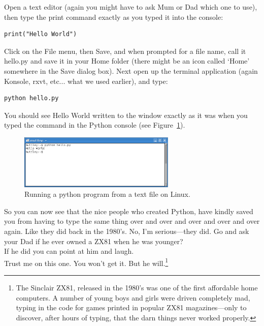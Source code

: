 \begin{LINUX}
Open a text editor (again you might have to ask Mum or Dad which one to use), then type the print command exactly as you typed it into the console:

\begin{listing}
\begin{verbatim}
print("Hello World")
\end{verbatim}
\end{listing}

Click on the File menu, then Save, and when prompted for a file name, call it hello.py and save it in your Home folder (there might be an icon called `Home' somewhere in the Save dialog box).  Next open up the terminal application (again Konsole, rxvt, etc... what we used earlier), and type:

\begin{listing}
\begin{verbatim}
python hello.py
\end{verbatim}
\end{listing}

You should see Hello World written to the window exactly as it was when you typed the command in the Python console (see Figure~\ref{fig9}).

\begin{figure}
\begin{center}
\includegraphics[width=75mm]{eps/figure9.eps}
\end{center}
\caption{Running a python program from a text file on Linux.}\label{fig9}
\end{figure}
\end{LINUX}

So you can now see that the nice people who created Python, have kindly saved you from having to type the same thing over and over and over and over and over again.  Like they did back in the 1980's.  No, I'm serious---they did.  Go and ask your Dad if he ever owned a ZX81 when he was younger?\\

\noindent
If he did you can point at him and laugh.\\

\noindent
Trust me on this one.  You won't get it.  But he will.\footnote{The Sinclair ZX81, released in the 1980's was one of the first affordable home computers.  A number of young boys and girls were driven completely mad, typing in the code for games printed in popular ZX81 magazines---only to discover, after hours of typing, that the darn things never worked properly.}


